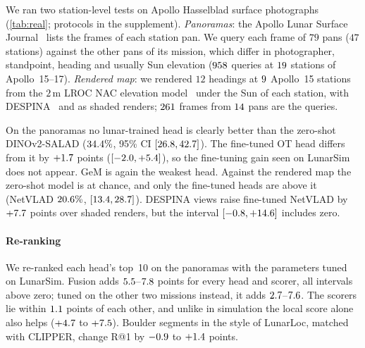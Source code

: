 We ran two station-level tests on Apollo Hasselblad surface
photographs~\cite{asuapollo} (\cref{tab:real}; protocols in the supplement). \emph{Panoramas}: the
Apollo Lunar Surface Journal~\cite{alsj} lists the frames of each station pan. We query each
frame of $79$ pans ($47$ stations) against the other pans of its mission, which differ in photographer,
standpoint, heading and usually Sun elevation ($958$ queries at $19$ stations of Apollo~15--17). \emph{Rendered map}: we rendered $12$ headings at $9$ Apollo~15 stations from the $2$\,m LROC
NAC elevation model~\cite{robinson2010lroc} under the Sun of each station, with DESPINA~\cite{nelsonarcher2026despina}
and as shaded renders; $261$ frames from $14$ pans are the queries.



On the panoramas no lunar-trained head is clearly better than the zero-shot DINOv2-SALAD ($34.4\%$, 95\% CI
$[26.8,42.7]$). The fine-tuned OT head differs from it by
$+1.7$ points ($[-2.0,+5.4]$), so the fine-tuning gain seen on LunarSim
does not appear. GeM is again the weakest head. Against the
rendered map the zero-shot model is at chance, and only the fine-tuned heads are above it (NetVLAD
$20.6\%$, $[13.4,28.7]$). DESPINA views raise fine-tuned NetVLAD by $+7.7$ points over
shaded renders, but the interval $[-0.8,+14.6]$ includes zero.

\paragraph*{Re-ranking}
We re-ranked each head's top~10 on the panoramas with the parameters tuned on LunarSim. Fusion adds
$5.5$--$7.8$ points for every head and scorer, all intervals above zero; tuned on the other two
missions instead, it adds $2.7$--$7.6$. The scorers lie within $1.1$ points of each other, and unlike in simulation the
local score alone also helps ($+4.7$ to $+7.5$). Boulder segments in the style of LunarLoc,
matched with CLIPPER, change R@1 by $-0.9$ to $+1.4$ points.
